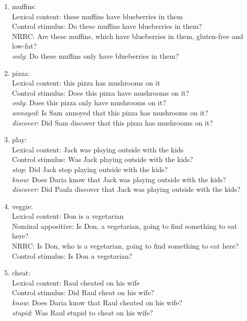 \documentclass[11pt,fleqn]{article}
\newcommand{\6}{\mbox{$[\hspace*{-.6mm}[$}}
\newcommand{\9}{\mbox{$]\hspace*{-.6mm}]$}}
\begin{document}
\begin{enumerate}

\item  muffins:  \\
     Lexical content: these muffins have blueberries in them\\
     Control stimulus: Do these muffins have blueberries in them?\\
     NRRC: Are these muffins, which have blueberries in them, gluten-free and low-fat?\\
     {\em only}: Do these muffins only have blueberries in them?

\item pizza:  \\
     Lexical content: this pizza has mushrooms on it\\
     Control stimulus: Does this pizza have mushrooms on it?\\
     {\em only}: Does this pizza only have mushrooms on it?\\
     {\em annoyed}: Is Sam annoyed that this pizza has mushrooms on it?\\
     {\em discover}: Did Sam discover that this pizza has mushrooms on it?

\item play:  \\
     Lexical content: Jack was playing outside with the kids\\
     Control stimulus: Was Jack playing outside with the kids?\\
     {\em stop}: Did Jack stop playing outside with the kids?\\
     {\em know}: Does Daria know that Jack was playing outside with the kids?\\
     {\em discover}: Did Paula discover that Jack was playing outside with the kids?

\item veggie:  \\
     Lexical content: Don is a vegetarian\\
     Nominal appositive: Is Don, a vegetarian, going to find something to eat here?\\
     NRRC: Is Don, who is a vegetarian, going to find something to eat here?\\
     Control stimulus: Is Don a vegetarian?

\item cheat:  \\
     Lexical content: Raul cheated on his wife\\
     Control stimulus: Did Raul cheat on his wife?\\
     {\em know}: Does Daria know that Raul cheated on his wife?\\
     {\em stupid}: Was Raul stupid to cheat on his wife?


\end{enumerate}
\end{document}
